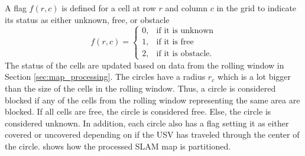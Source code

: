 A flag $f(r,c)$ is defined for a cell at row $r$ and column $c$ in the grid to indicate its status as either unknown, free, or obstacle
\begin{equation} \label{eq:circular_cell_status}
f(r,c) = 
\begin{cases}
0, & \text{if it is unknown} \\
1, & \text{if it is free} \\
2, & \text{if it is obstacle.} 
\end{cases}
\end{equation}
The status of the cells are updated based on data from the rolling window in Section \ref{sec:map_processing}. The circles have a radius $r_c$ which is a lot bigger than the size of the cells in the rolling window. Thus, a circle is considered blocked if any of the cells from the rolling window representing the same area are blocked. If all cells are free, the circle is considered free. Else, the circle is considered unknown. In addition, each circle also has a flag setting it as either covered or uncovered depending on if the USV has traveled through the center of the circle.  shows how the processed SLAM map is partitioned.

